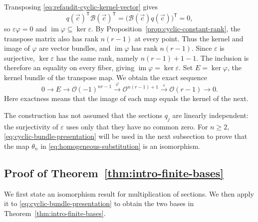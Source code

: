 \documentclass[12pt,reqno,a4paper]{amsart}
\numberwithin{equation}{section}
\numberwithin{figure}{section}
\theoremstyle{plain}
\theoremstyle{definition}
\begin{document}
Transposing \eqref{eq:refaudit-cyclic-kernel-vector} gives
\[
 q(\vec c)^{\mathsf T}\mathcal B(\vec c)^{\mathsf T}
   =\bigl(\mathcal B(\vec c)q(\vec c)\bigr)^{\mathsf T}=0,
\]
so $\varepsilon\varphi=0$ and
$\operatorname{im}\varphi\subseteq\ker\varepsilon$.
By Proposition~\ref{prop:cyclic-constant-rank}, the transpose matrix
also has rank $n(r-1)$ at every point. Thus the kernel and image
of $\varphi$ are vector bundles, and $\operatorname{im}\varphi$
has rank $n(r-1)$. Since $\varepsilon$ is surjective,
$\ker\varepsilon$ has the same rank, namely $n(r-1)+1-1$.
The inclusion is therefore an equality on every fiber, giving
$\operatorname{im}\varphi=\ker\varepsilon$.
Set $E=\ker\varphi$, the kernel bundle of the transpose map.
We obtain the exact sequence
\begin{equation}\label{eq:cyclic-bundle-presentation}
 0\longrightarrow E\longrightarrow
 \mathcal O(-1)^{nr-1}\xrightarrow{\varphi}
 \mathcal O^{n(r-1)+1}\xrightarrow{\varepsilon}
 \mathcal O(r-1)\longrightarrow0.
\end{equation}
Here exactness means that the image of each map equals the kernel
of the next.

The construction has not assumed that the sections $q_j$ are
linearly independent: the surjectivity of $\varepsilon$ uses only
that they have no common zero.
For $n\ge2$, \eqref{eq:cyclic-bundle-presentation} will be used
in the next subsection to prove that the map $\theta_n$ in
\eqref{eq:homogeneous-substitution} is an isomorphism.

\subsection{Proof of Theorem~\ref{thm:intro-finite-bases}}
\label{subsec:multiplication-and-bases}

We first state an isomorphism result for multiplication of sections.
We then apply it to \eqref{eq:cyclic-bundle-presentation} to obtain
the two bases in Theorem~\ref{thm:intro-finite-bases}.
\end{document}
